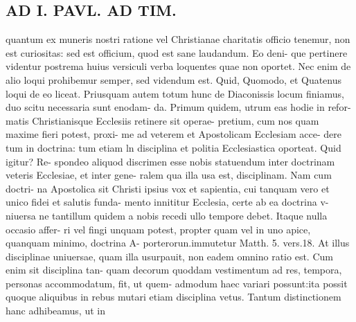 \documentclass{article}
\begin{document}
\begin{pages}
\section*{AD I. PAVL. AD TIM. }
\marginpar{[ p.286 ]}quantum ex muneris nostri ratione vel Christianae charitatis officio tenemur, non est curiositas: sed est officium, quod est sane laudandum. Eo deni- que pertinere videntur postrema huius versiculi verba loquentes quae non oportet. Nec enim de alio loqui prohibemur semper, sed videndum est. Quid, Quomodo, et Quatenus loqui de eo liceat. Priusquam autem totum hunc de Diaconissis locum finiamus, duo scitu necessaria sunt enodam- da. Primum quidem, utrum eas hodie in refor- matis Christianisque Ecclesiis retinere sit operae- pretium, cum nos quam maxime fieri potest, proxi- me ad veterem et Apostolicam Ecclesiam acce- dere tum in doctrina: tum etiam ln disciplina et politia Ecclesiastica oporteat. Quid igitur? Re- spondeo aliquod discrimen esse nobis statuendum inter doctrinam veteris Ecclesiae, et inter gene- ralem qua illa usa est, disciplinam. Nam cum doctri- na Apostolica sit Christi ipsius vox et sapientia, cui tanquam vero et unico fidei et salutis funda- mento innititur Ecclesia, certe ab ea doctrina v- niuersa ne tantillum quidem a nobis recedi ullo tempore debet. Itaque nulla occasio affer- ri vel fingi unquam potest, propter quam vel in uno apice, quanquam minimo, doctrina A- porterorun.immutetur Matth. 5. vers.18. At illus disciplinae uniuersae, quam illa usurpauit, non eadem omnino ratio est. Cum enim sit disciplina tan- quam decorum quoddam vestimentum ad res, tempora, personas accommodatum, fit, ut quem- admodum haec variari possunt:ita possit quoque aliquibus in rebus mutari etiam disciplina vetus. Tantum distinctionem hanc adhibeamus, ut in 

\end{pages}
\end{document}
